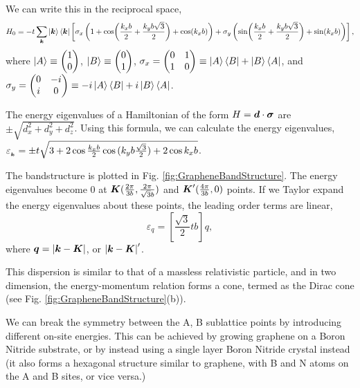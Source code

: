 \documentclass{report}
\renewcommand\vec[1]{\ensuremath\boldsymbol{#1}} %
\begin{document}
We can write this in the reciprocal space,
$$H_0 = -t \sum_{\vec{k}} \ket{\vec{k}}\bra{\vec{k}} \left[\sigma_x \left(1 + \cos(\frac{k_x b}{2} + \frac{k_y b \sqrt{3}}{2}) + \cos(k_x b)\right) + \sigma_y \left( \sin(\frac{k_x b}{2} + \frac{k_y b \sqrt{3}}{2}) + \sin(k_x b)\right)\right],$$
where $\ket{A} \equiv \begin{pmatrix}
1 \\
0 
\end{pmatrix}$, 
$\ket{B} \equiv \begin{pmatrix}
0 \\
1 
\end{pmatrix}$,
$\sigma_x = 
\begin{pmatrix}
	0 & 1 \\
	1 & 0
\end{pmatrix} \equiv \ket{A} \bra{B} + \ket{B} \bra{A}$, and 
$\sigma_y = 
\begin{pmatrix}
	0 & -i \\
	i & 0
\end{pmatrix} \equiv -i\ket{A} \bra{B} + i\ket{B} \bra{A}$.

The energy eigenvalues of a Hamiltonian of the form $H = \vec{d} \cdot \vec{\sigma}$ are $\pm \sqrt{d_x^2 + d_y^2 + d_z^2}$. Using this formula, we can calculate the energy eigenvalues,
$\varepsilon_{_{\vec{k}}}  = \pm t \sqrt{3 + 2 \cos{\frac{k_x b}{2}} \cos{(k_y b \frac{\sqrt{3}}{2})} + 2 \cos{k_x b}}$.

The bandstructure is plotted in Fig. \ref{fig:GrapheneBandStructure}. The energy eigenvalues become 0 at $\vec{K} (\frac{2\pi}{3b},\frac{2\pi}{\sqrt{3} b})$ and $\vec{K}'(\frac{4\pi}{3b},0)$ points. If we Taylor expand the energy eigenvalues about these points, the leading order terms are linear, $$\varepsilon_{q} = \left[\frac{\sqrt{3}}{2} t b\right] q,$$ where $\vec{q} = \left| \vec{k} - \vec{K} \right|$, or $\left| \vec{k} - \vec{K} \right|'$.

This dispersion is similar to that of a massless relativistic particle, and in two dimension, the energy-momentum relation forms a cone, termed as the Dirac cone (see Fig. \ref{fig:GrapheneBandStructure}(b)).

We can break the symmetry between the A, B sublattice points by introducing different on-site energies. This can be achieved by growing graphene on a Boron Nitride substrate, or by instead using a single layer Boron Nitride crystal instead (it also forms a hexagonal structure similar to graphene, with B and N atoms on the A and B sites, or vice versa.)
\end{document}
